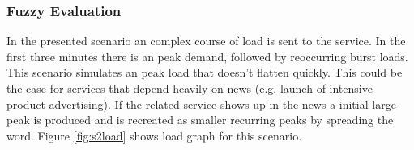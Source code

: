 %
%
%
%


\subsubsection{Fuzzy Evaluation}\label{SimScen2}
In the presented scenario an complex course of load is sent to the service. In the first three minutes there is an peak demand, followed by reoccurring burst loads. This scenario simulates an peak load that doesn't  flatten quickly. This could be the case for services that depend heavily on news (e.g. launch of intensive product advertising). If the related service shows up in the news a initial large peak is produced and is recreated as smaller recurring peaks by spreading the word. Figure \ref{fig:s2load} shows load graph for this scenario.%

